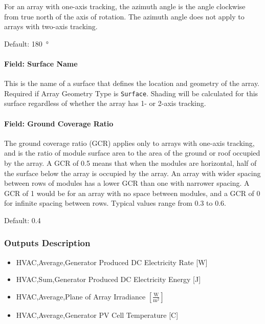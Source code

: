 For an array with one-axis tracking, the azimuth angle is the angle
clockwise from true north of the axis of rotation. The azimuth angle
does not apply to arrays with two-axis tracking.

Default: \SI{180}{\degree}

\paragraph{Field: Surface Name}\label{generatorpvwatts-field-surface-name}

This is the name of a surface that defines the location and geometry of
the array. Required if Array Geometry Type is \texttt{Surface}. Shading
will be calculated for this surface regardless of whether the array has
1- or 2-axis tracking.

\paragraph{Field: Ground Coverage
Ratio}\label{field-ground-coverage-ratio}

The ground coverage ratio (GCR) applies only to arrays with one-axis
tracking, and is the ratio of module surface area to the area of the
ground or roof occupied by the array. A GCR of 0.5 means that when the
modules are horizontal, half of the surface below the array is occupied
by the array. An array with wider spacing between rows of modules has a
lower GCR than one with narrower spacing. A GCR of 1 would be for an
array with no space between modules, and a GCR of 0 for infinite spacing
between rows. Typical values range from 0.3 to 0.6.

Default: 0.4

\subsubsection{Outputs Description}\label{outputs-description}

\begin{itemize}
\item
  HVAC,Average,Generator Produced DC Electricity Rate {[}W{]}
\item
  HVAC,Sum,Generator Produced DC Electricity Energy {[}J{]}
\item
  HVAC,Average,Plane of Array Irradiance $\left [\frac{\text{W}}{\text{m}^2} \right ]$
\item
  HVAC,Average,Generator PV Cell Temperature {[}C{]}
\end{itemize}


